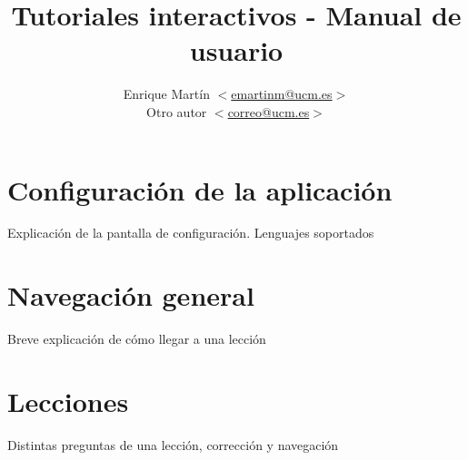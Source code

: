 \documentclass[]{article}
\title{Tutoriales interactivos - Manual de usuario}
\author{Enrique Martín $<$\url{emartinm@ucm.es}$>$ \\ Otro autor $<$\url{correo@ucm.es}$>$\\}
\begin{document}
\maketitle

\section{Configuración de la aplicación}
Explicación de la pantalla de configuración. Lenguajes soportados

\section{Navegación general}
Breve explicación de cómo llegar a una lección

\section{Lecciones}
Distintas preguntas de una lección, corrección y navegación
\end{document}
